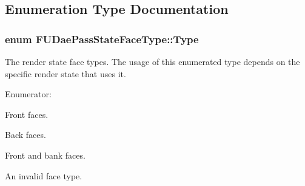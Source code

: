 \subsection{Enumeration Type Documentation}
\hypertarget{namespaceFUDaePassStateFaceType_a67c5007ab2cdb2e4fedc5fb800b82b4a}{
\subsubsection[{Type}]{\setlength{\rightskip}{0pt plus 5cm}enum {\bf FUDaePassStateFaceType::Type}}}
\label{namespaceFUDaePassStateFaceType_a67c5007ab2cdb2e4fedc5fb800b82b4a}
The render state face types. The usage of this enumerated type depends on the specific render state that uses it. \begin{Desc}
\item[Enumerator: ]\par
\begin{description}
\item[{\em 
\hypertarget{namespaceFUDaePassStateFaceType_a67c5007ab2cdb2e4fedc5fb800b82b4aacaa4b063604865112819e36222da6ac7}{
FRONT}
\label{namespaceFUDaePassStateFaceType_a67c5007ab2cdb2e4fedc5fb800b82b4aacaa4b063604865112819e36222da6ac7}
}]Front faces. \item[{\em 
\hypertarget{namespaceFUDaePassStateFaceType_a67c5007ab2cdb2e4fedc5fb800b82b4aa1ca8373dcda6764c667c9cef6c085ccc}{
BACK}
\label{namespaceFUDaePassStateFaceType_a67c5007ab2cdb2e4fedc5fb800b82b4aa1ca8373dcda6764c667c9cef6c085ccc}
}]Back faces. \item[{\em 
\hypertarget{namespaceFUDaePassStateFaceType_a67c5007ab2cdb2e4fedc5fb800b82b4aa97874d57fc5a1f44a176de1d659d78fe}{
FRONT\_\-AND\_\-BACK}
\label{namespaceFUDaePassStateFaceType_a67c5007ab2cdb2e4fedc5fb800b82b4aa97874d57fc5a1f44a176de1d659d78fe}
}]Front and bank faces. \item[{\em 
\hypertarget{namespaceFUDaePassStateFaceType_a67c5007ab2cdb2e4fedc5fb800b82b4aa3f13f84e92f024db9b0a5cbe0e430ed4}{
INVALID}
\label{namespaceFUDaePassStateFaceType_a67c5007ab2cdb2e4fedc5fb800b82b4aa3f13f84e92f024db9b0a5cbe0e430ed4}
}]An invalid face type. \end{description}
\end{Desc}



